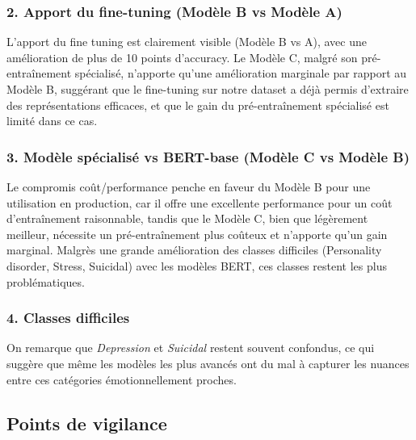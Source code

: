 \documentclass[12pt,a4paper]{article}
\begin{document}
\subsubsection{2. Apport du fine-tuning (Modèle B vs Modèle A)}
L'apport du fine tuning est clairement visible (Modèle B vs A), avec une amélioration de plus de 10 points d'accuracy.
Le Modèle C, malgré son pré-entraînement spécialisé, n'apporte qu'une amélioration marginale par rapport au Modèle B, 
suggérant que le fine-tuning sur notre dataset a déjà permis d'extraire des représentations efficaces, 
et que le gain du pré-entraînement spécialisé est limité dans ce cas.

\subsubsection{3. Modèle spécialisé vs BERT-base (Modèle C vs Modèle B)}
Le compromis coût/performance penche en faveur du Modèle B pour une utilisation en production,
car il offre une excellente performance pour un coût d'entraînement raisonnable, tandis que le Modèle C, bien que légèrement meilleur,
nécessite un pré-entraînement plus coûteux et n'apporte qu'un gain marginal.
Malgrès une grande amélioration des classes difficiles (Personality disorder, Stress, Suicidal) avec les modèles BERT,
ces classes restent les plus problématiques. 

\subsubsection{4. Classes difficiles}
On remarque que \textit{Depression} et \textit{Suicidal} restent souvent confondus, 
ce qui suggère que même les modèles les plus avancés ont du mal à capturer les nuances entre ces catégories émotionnellement proches.


\subsection{Points de vigilance}
\end{document}
